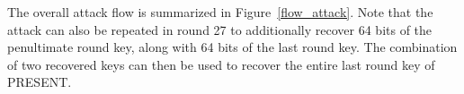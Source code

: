 \documentclass[10pt, conference, compsocconf]{IEEEtran}  %
\numberwithin{Definition}{section}
\numberwithin{Claim}{section}
\begin{document}
The overall attack flow is summarized in Figure~\ref{flow_attack}. Note that the attack can also be repeated in round 27 to additionally recover 64 bits of the penultimate round key, along with 64 bits of the last round key. The combination of two recovered keys can then be used to recover the entire last round key of PRESENT. 

\end{document}
